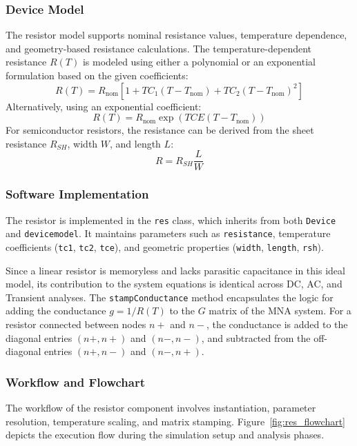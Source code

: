 \subsubsection{Device Model}
The resistor model supports nominal resistance values, temperature dependence, and geometry-based resistance calculations. The temperature-dependent resistance $R(T)$ is modeled using either a polynomial or an exponential formulation based on the given coefficients:
\begin{equation}
    R(T) = R_{\text{nom}} \left[ 1 + TC_1 (T - T_{\text{nom}}) + TC_2 (T - T_{\text{nom}})^2 \right]
\end{equation}
Alternatively, using an exponential coefficient:
\begin{equation}
    R(T) = R_{\text{nom}} \exp\left( TCE (T - T_{\text{nom}}) \right)
\end{equation}
For semiconductor resistors, the resistance can be derived from the sheet resistance $R_{SH}$, width $W$, and length $L$:
\begin{equation}
    R = R_{SH} \frac{L}{W}
\end{equation}

\subsubsection{Software Implementation}
The resistor is implemented in the \texttt{res} class, which inherits from both \texttt{Device} and \texttt{devicemodel}. It maintains parameters such as \texttt{resistance}, temperature coefficients (\texttt{tc1}, \texttt{tc2}, \texttt{tce}), and geometric properties (\texttt{width}, \texttt{length}, \texttt{rsh}).

Since a linear resistor is memoryless and lacks parasitic capacitance in this ideal model, its contribution to the system equations is identical across DC, AC, and Transient analyses. The \texttt{stampConductance} method encapsulates the logic for adding the conductance $g = 1/R(T)$ to the $G$ matrix of the MNA system. For a resistor connected between nodes $n+$ and $n-$, the conductance is added to the diagonal entries $(n+, n+)$ and $(n-, n-)$, and subtracted from the off-diagonal entries $(n+, n-)$ and $(n-, n+)$.

\subsubsection{Workflow and Flowchart}
The workflow of the resistor component involves instantiation, parameter resolution, temperature scaling, and matrix stamping. Figure~\ref{fig:res_flowchart} depicts the execution flow during the simulation setup and analysis phases.

